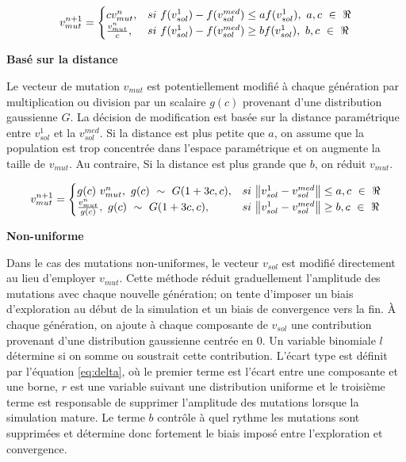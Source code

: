 \documentclass{article}
\begin{document}
\begin{equation}
	v^{n+1}_{mut} = \begin{cases}
						cv^{n}_{mut}, & si\ f(v^1_{sol}) - f(v^{med}_{sol}) \le a f(v^1_{sol}),\ a,c\ \in\ \real \\
						\frac{v^{n}_{mut}}{c}, & si\ f(v^1_{sol}) - f(v^{med}_{sol}) \ge bf(v^1_{sol}),\ b,c\ \in\ \real
					\end{cases}  
\end{equation}

\vspace{0.3cm}
\noindent\textbf{Basé sur la distance}

Le vecteur de mutation $v_{mut}$ est potentiellement modifié à chaque génération par multiplication ou division par un scalaire $g(c)$ provenant d'une distribution gaussienne $G$. La décision de modification est basée sur la distance paramétrique entre $v^1_{sol}$ et la $v^{med}_{sol}$. Si la distance est plus petite que $a$, on assume que la population est trop concentrée dans l'espace paramétrique et on augmente la taille de $v_{mut}$. Au contraire, Si la distance est plus grande que $b$, on réduit $v_{mut}$.

\begin{equation}
	v^{n+1}_{mut} = \begin{cases}
						g(c)\ v^{n}_{mut},\ g(c)\ \sim\ G(1+3c, c), & si\ \norm{v^1_{sol} - v^{med}_{sol}} \le a,c\ \in\ \real\\
						\frac{v^{n}_{mut}}{g(c)},\ g(c)\ \sim\ G(1+3c, c), & si\  \norm{v^1_{sol} - v^{med}_{sol}} \ge b,c\ \in\ \real \\
					\end{cases}  
\end{equation}

\vspace{0.3cm}
\noindent\textbf{Non-uniforme}

Dans le cas des mutations non-uniformes, le vecteur $v_{sol}$ est modifié directement au lieu d'employer $v_{mut}$. Cette méthode\cite{neurodim} réduit graduellement l'amplitude des mutations avec chaque nouvelle génération; on tente d'imposer un biais d'exploration au début de la simulation et un biais de convergence vers la fin. À chaque génération, on ajoute à chaque composante de $v_{sol}$ une contribution provenant d'une distribution gaussienne centrée en $0$. Un variable binomiale $l$ détermine si on somme ou soustrait cette contribution. L'écart type est définit par l'équation \ref{eq:delta}, où le premier terme est l'écart entre une composante et une borne, $r$ est une variable suivant une distribution uniforme et le troisième terme est responsable de supprimer l'amplitude des mutations lorsque la simulation mature. Le terme $b$ contrôle à quel rythme les mutations sont supprimées et détermine donc fortement le biais imposé entre l'exploration et convergence. 
\end{document}
